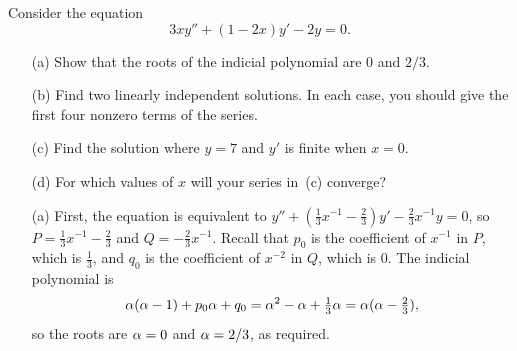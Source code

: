 \documentclass[a4paper]{amsart}
\begin{document}
\begin{exercise}\label{ex-frobenius-a}
 Consider the equation
 \[ 3xy'' + (1-2x)y' - 2y = 0. \]
 \begin{itemize}
  \item[(a)] Show that the roots of the indicial polynomial are $0$ and $2/3$.
  \item[(b)] Find two linearly independent solutions.  In each case,
   you should give the first four nonzero terms of the series.
  \item[(c)] Find the solution where $y=7$ and $y'$ is finite when $x=0$.
  \item[(d)] For which values of $x$ will your series in~(c) converge?
 \end{itemize}
\end{exercise}
\begin{solution}
 \begin{itemize}
  \item[(a)]
   First, the equation is equivalent to
   $y''+(\frac{1}{3}x^{-1}-\frac{2}{3})y'-\frac{2}{3}x^{-1}y=0$, so
   $P=\frac{1}{3}x^{-1}-\frac{2}{3}$ and $Q=-\frac{2}{3}x^{-1}$.  Recall
   that $p_0$ is the coefficient of $x^{-1}$ in $P$, which is
   $\frac{1}{3}$, and $q_0$ is the coefficient of $x^{-2}$ in $Q$, which
   is $0$.  The indicial polynomial is 
   \[ \alpha(\alpha-1) + p_0\alpha + q_0 = \alpha^2-\alpha+\tfrac{1}{3}\alpha = 
       \alpha(\alpha-\tfrac{2}{3}),
   \]
   so the roots are $\alpha=0$ and $\alpha=2/3$, as required.
  

\end{itemize}
\end{solution}
\end{document}
